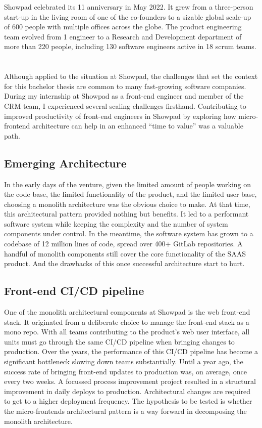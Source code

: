 Showpad celebrated its 11 anniversary in May 2022. It grew from a three-person start-up in the living room of one of the co-founders to a sizable global scale-up of 600 people with multiple offices across the globe. The product engineering team evolved from 1 engineer to a Research and Development department of more than 220 people, including 130 software engineers active in 18 scrum teams. 
\section{}
\label{sec:probleemstelling}
Although applied to the situation at Showpad, the challenges that set the context for this bachelor thesis are common to many fast-growing software companies.
During my internship at Showpad as a front-end engineer and member of the CRM team, I experienced several scaling challenges firsthand. Contributing to improved productivity of front-end engineers in Showpad by exploring how micro-frontend architecture can help in an enhanced ``time to value'' was a valuable path.
\subsection{Emerging Architecture}
In the early days of the venture, given the limited amount of people working on the code base, the limited functionality of the product, and the limited user base, choosing a monolith architecture was the obvious choice to make. At that time, this architectural pattern provided nothing but benefits. It led to a performant software system while keeping the complexity and the number of system components under control. In the meantime, the software system has grown to a codebase of 12 million lines of code, spread over 400+ GitLab repositories. A handful of monolith components still cover the core functionality of the \gls{SAAS} product. And the drawbacks of this once successful architecture start to hurt.
\subsection{Front-end CI/CD pipeline}
One of the monolith architectural components at Showpad is the web front-end stack. It originated from a deliberate choice to manage the front-end stack as a mono repo. With all teams contributing to the product's web user interface, all units must go through the same \gls{CI/CD} pipeline when bringing changes to production. Over the years, the performance of this \gls{CI/CD} pipeline has become a significant bottleneck slowing down teams substantially. 
Until a year ago, the success rate of bringing front-end updates to production was, on average, once every two weeks. A focussed process improvement project resulted in a structural improvement in daily deploys to production. 
Architectural changes are required to get to a higher deployment frequency. The hypothesis to be tested is whether the micro-frontends architectural pattern is a way forward in decomposing the monolith architecture.
